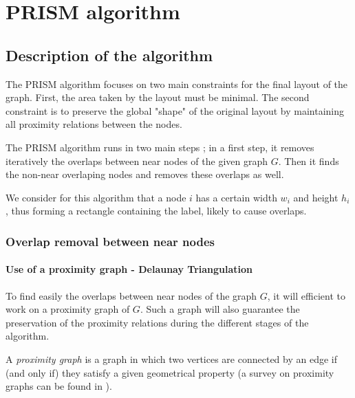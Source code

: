 \documentclass[12pt]{report}
\begin{document}


\chapter{PRISM algorithm}

\section{Description of the algorithm}

The PRISM algorithm focuses on two main constraints for the final layout of the graph. First, the area taken by the layout must be minimal. The second constraint is to preserve the global "shape" of the original layout by maintaining all proximity relations between the nodes.

The PRISM algorithm runs in two main steps ; in a first step, it removes iteratively the overlaps between near nodes of the given graph $G$. Then it finds the non-near overlaping nodes and removes these overlaps as well.

We consider for this algorithm that a node $i$ has a certain width $w_i$ and height $h_i$, thus forming a rectangle containing the label, likely to cause overlaps.

\subsection{Overlap removal between near nodes}

\subsubsection{Use of a proximity graph - Delaunay Triangulation}

To find easily the overlaps between near nodes of the graph $G$, it will efficient to work on a proximity graph of $G$. Such a graph will also guarantee the preservation of the proximity relations during the different stages of the algorithm.

A \emph{proximity graph} is a graph in which two vertices are connected by an edge if (and only if) they satisfy a given geometrical property (a survey on proximity graphs can be found in \cite{JT92}).

\bigskip
\end{document}
